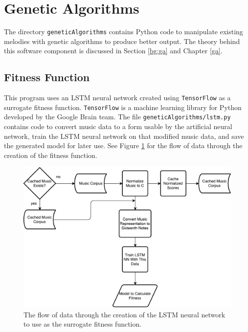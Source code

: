 \section{Genetic Algorithms} \label{software:ga}

The directory \texttt{geneticAlgorithms} contains Python code to manipulate existing melodies with genetic algorithms to produce better output.
The theory behind this software component is discussed in Section \ref{bg:ga} and Chapter \ref{ga}.

\subsection{Fitness Function} \label{software:ga:fitness}

This program uses an LSTM neural network created using \texttt{TensorFlow} as a surrogate fitness function.
\texttt{TensorFlow} is a machine learning library for Python developed by the Google Brain team.
The file \texttt{geneticAlgorithms/lstm.py} contains code to convert music data to a form usable by the artificial neural network, train the LSTM neural network on that modified music data, and save the generated model for later use.
See Figure \ref{fig:lstmflowchart} for the flow of data through the creation of the fitness function.

\begin{figure}[h!]
	\centering
	\includegraphics[width=\linewidth]{figures/lstm_flowchart.pdf}
	\caption{The flow of data through the creation of the LSTM neural network to use as the surrogate fitness function.}
	\label{fig:lstmflowchart}
\end{figure}


